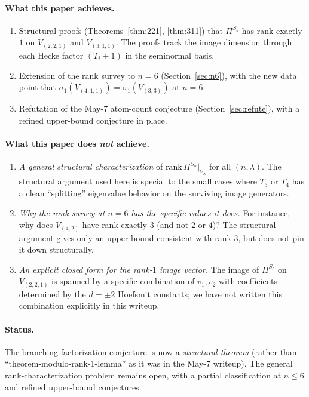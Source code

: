 \documentclass[11pt]{article}
\theoremstyle{definition}
\begin{document}
\paragraph{What this paper achieves.}
\begin{enumerate}[leftmargin=2em,topsep=0.3em,itemsep=0.2em]
\item Structural proofs (Theorems~\ref{thm:221}, \ref{thm:311})
that $\Pi^{S_5}$ has rank exactly $1$ on $V_{(2,2,1)}$ and $V_{(3,1,1)}$.
The proofs track the image dimension through each Hecke factor
$(T_i+1)$ in the seminormal basis.
\item Extension of the rank survey to $n=6$
(Section~\ref{sec:n6}), with the new data point that
$\sigma_1(V_{(4,1,1)}) = \sigma_1(V_{(3,3)})$ at $n=6$.
\item Refutation of the May-7 atom-count conjecture
(Section~\ref{sec:refute}), with a refined upper-bound
conjecture in place.
\end{enumerate}

\paragraph{What this paper does \emph{not} achieve.}
\begin{enumerate}[leftmargin=2em,topsep=0.3em,itemsep=0.2em]
\item \emph{A general structural characterization} of
$\mathrm{rank}\,\Pi^{S_n}|_{V_\lambda}$ for all $(n, \lambda)$.
The structural argument used here is special to the small
cases where $T_3$ or $T_4$ has a clean ``splitting'' eigenvalue
behavior on the surviving image generators.
\item \emph{Why the rank survey at $n=6$ has the specific values it does.}
For instance, why does $V_{(4,2)}$ have rank exactly $3$ (and not $2$
or $4$)? The structural argument gives only an upper bound consistent
with rank $3$, but does not pin it down structurally.
\item \emph{An explicit closed form for the rank-$1$ image vector.}
The image of $\Pi^{S_5}$ on $V_{(2,2,1)}$ is spanned by a specific
combination of $v_1, v_2$ with coefficients determined by the
$d=\pm 2$ Hoefsmit constants; we have not written this combination
explicitly in this writeup.
\end{enumerate}

\paragraph{Status.} The branching factorization conjecture is now a
\emph{structural theorem} (rather than ``theorem-modulo-rank-1-lemma''
as it was in the May-7 writeup). The general rank-characterization
problem remains open, with a partial classification at $n \leq 6$
and refined upper-bound conjectures.
\end{document}
